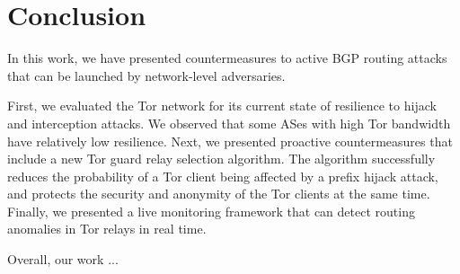 \section{Conclusion}

In this work, we have presented countermeasures to active BGP routing attacks that can be launched by network-level adversaries. 

First, we evaluated the Tor network for its current state of resilience to hijack and interception attacks.  
We observed that some ASes with high Tor bandwidth have relatively low resilience.  Next, we presented proactive countermeasures that include a new Tor guard relay selection algorithm. The algorithm successfully reduces the probability of a Tor client being affected by a prefix hijack attack, and protects the security and anonymity of the Tor clients at the same time. Finally, we presented a live monitoring framework that can detect routing anomalies in Tor relays in real time. 

Overall, our work ...
